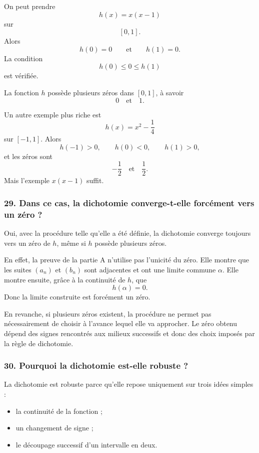 \documentclass[11pt,a4paper]{article}
\begin{document}
On peut prendre
\[
h(x)=x(x-1)
\]
sur
\[
[0,1].
\]
Alors
\[
h(0)=0
\qquad\text{et}\qquad
h(1)=0.
\]
La condition
\[
h(0)\leq0\leq h(1)
\]
est vérifiée.

La fonction \(h\) possède plusieurs zéros dans \([0,1]\), à savoir
\[
0
\quad\text{et}\quad
1.
\]

Un autre exemple plus riche est
\[
h(x)=x^2-\frac14
\]
sur \([-1,1]\). Alors
\[
h(-1)>0,
\qquad
h(0)<0,
\qquad
h(1)>0,
\]
et les zéros sont
\[
-\frac12
\quad\text{et}\quad
\frac12.
\]
Mais l'exemple \(x(x-1)\) suffit.


\subsubsection*{29. Dans ce cas, la dichotomie converge-t-elle forcément vers un zéro ?}

Oui, avec la procédure telle qu'elle a été définie, la dichotomie converge toujours vers un zéro de \(h\), même si \(h\) possède plusieurs zéros.

En effet, la preuve de la partie A n'utilise pas l'unicité du zéro. Elle montre que les suites \((a_n)\) et \((b_n)\) sont adjacentes et ont une limite commune \(\alpha\). Elle montre ensuite, grâce à la continuité de \(h\), que
\[
h(\alpha)=0.
\]
Donc la limite construite est forcément un zéro.

En revanche, si plusieurs zéros existent, la procédure ne permet pas nécessairement de choisir à l'avance lequel elle va approcher. Le zéro obtenu dépend des signes rencontrés aux milieux successifs et donc des choix imposés par la règle de dichotomie.


\subsubsection*{30. Pourquoi la dichotomie est-elle robuste ?}

La dichotomie est robuste parce qu'elle repose uniquement sur trois idées simples :

\begin{itemize}
    \item la continuité de la fonction ;
    \item un changement de signe ;
    \item le découpage successif d'un intervalle en deux.
\end{itemize}
\end{document}
